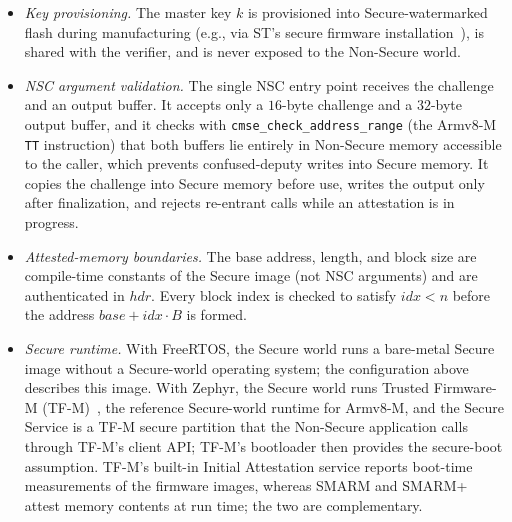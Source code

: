 \documentclass{ieeeaccess}
\newcommand{\rtsmarm}{SMARM+\xspace}
\begin{document}
{\begin{itemize}
  We assume this configuration in deployment; our measurements were taken at RDP level~$0$ to allow debugging, which does not affect runtime.
  \item \emph{Key provisioning.} The master key $k$ is provisioned into Secure-watermarked flash during manufacturing (e.g., via ST's secure firmware installation~\cite{an5347}), is shared with the verifier, and is never exposed to the Non-Secure world.
  \item \emph{NSC argument validation.} The single NSC entry point receives the challenge and an output buffer.
  It accepts only a $16$-byte challenge and a $32$-byte output buffer, and it checks with \texttt{cmse\_check\_address\_range} (the Armv8-M \texttt{TT} instruction) that both buffers lie entirely in Non-Secure memory accessible to the caller, which prevents confused-deputy writes into Secure memory.
  It copies the challenge into Secure memory before use, writes the output only after finalization, and rejects re-entrant calls while an attestation is in progress.
  \item \emph{Attested-memory boundaries.} The base address, length, and block size are compile-time constants of the Secure image (not NSC arguments) and are authenticated in $\mathit{hdr}$.
  Every block index is checked to satisfy $idx < n$ before the address $\mathit{base} + idx \cdot B$ is formed.
  \item \emph{Secure runtime.} With FreeRTOS, the Secure world runs a bare-metal Secure image without a Secure-world operating system; the configuration above describes this image.
  With Zephyr, the Secure world runs Trusted Firmware-M (TF-M)~\cite{tfm}, the reference Secure-world runtime for Armv8-M, and the Secure Service is a TF-M secure partition that the Non-Secure application calls through TF-M's client API; TF-M's bootloader then provides the secure-boot assumption.
  TF-M's built-in Initial Attestation service reports boot-time measurements of the firmware images, whereas SMARM and \rtsmarm attest memory contents at run time; the two are complementary.
\end{itemize}}
\end{document}
